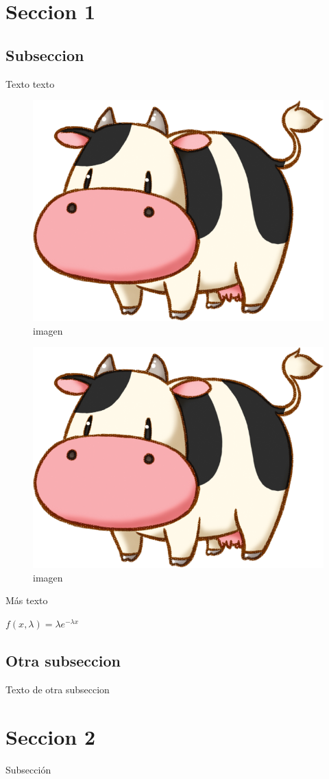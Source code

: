 \section{Seccion 1}\label{seccion-1}

\subsection{Subseccion}\label{subseccion}

Texto texto

\begin{figure}[htbp]
\centering
\includegraphics{cow.png}
\caption{imagen}
\end{figure}

\newpage

\begin{figure}[htbp]
\centering
\includegraphics{cow.png}
\caption{imagen}
\end{figure}

Más texto

\(f(x,\lambda) = \lambda e^{- \lambda x}\)

\subsection{Otra subseccion}\label{otra-subseccion}

Texto de otra subseccion

\section{Seccion 2}\label{seccion-2}

Subsección

